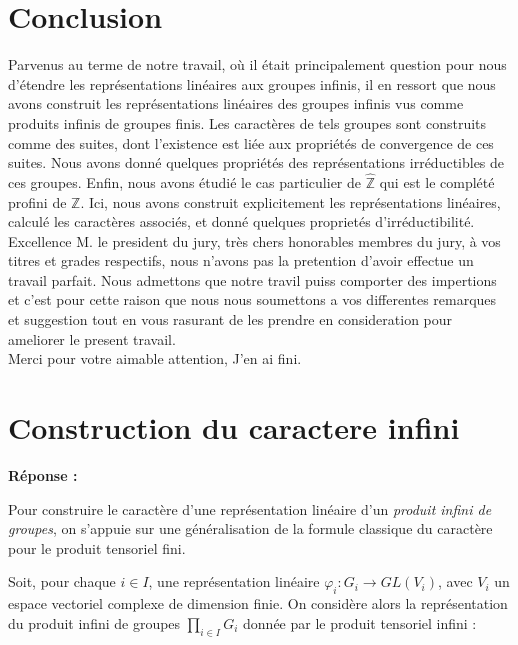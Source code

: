 \documentclass[a4paper, 14pt]{report}
\begin{document}
  

\section{Conclusion}
Parvenus au terme de notre travail, où il était principalement question pour nous d'étendre les représentations linéaires aux groupes infinis, il en ressort que nous avons construit les représentations linéaires des groupes infinis vus comme produits infinis de groupes finis.
Les caractères de tels groupes sont construits comme des suites, dont l'existence est liée aux propriétés de convergence de ces suites. Nous avons donné quelques propriétés des représentations irréductibles de ces groupes.
Enfin, nous avons étudié le cas particulier de \(\widehat{\mathbb{Z}}\) qui est le complété profini de \( \mathbb{Z} \). Ici, nous avons construit explicitement les représentations linéaires, calculé les caractères associés, et donné quelques proprietés d’irréductibilité.\\
Excellence M. le president du jury, très chers honorables membres du jury, à vos titres et grades respectifs, nous n'avons pas la pretention d'avoir effectue un travail parfait. Nous admettons que notre travil puiss comporter des impertions et c'est pour cette raison que nous nous soumettons a vos differentes remarques et suggestion tout en vous rasurant de les prendre en consideration pour ameliorer le present travail.\\

Merci pour votre aimable attention, J'en ai fini.

\section{Construction du caractere infini}

\textbf{Réponse :}

Pour construire le caractère d'une représentation linéaire d’un \textit{produit infini de groupes}, on s’appuie sur une généralisation de la formule classique du caractère pour le produit tensoriel fini. 

Soit, pour chaque \( i \in I \), une représentation linéaire \( \varphi_i : G_i \to GL(V_i) \), avec \( V_i \) un espace vectoriel complexe de dimension finie. On considère alors la représentation du produit infini de groupes \( \prod_{i \in I} G_i \) donnée par le produit tensoriel infini :
\end{document}
